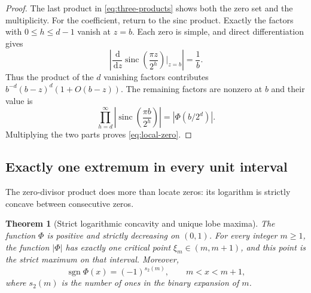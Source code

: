 \documentclass[11pt,oneside]{article}
\numberwithin{equation}{section}
\newtheorem{theorem}{Theorem}[section]
\theoremstyle{definition}
\theoremstyle{remark}
\newcommand{\dd}{\,\mathrm d}
\newcommand{\abs}[1]{\left|#1\right|}
\newcommand{\sinc}{\operatorname{sinc}}
\newcommand{\PhiUp}{\Phi}
\newcommand{\digitsum}{s_2}
\begin{document}
\begin{proof}
The last product in \eqref{eq:three-products} shows both the zero set and the multiplicity.
For the coefficient, return to the sinc product.  Exactly the factors with
\(0\le h\le d-1\) vanish at \(z=b\).  Each zero is simple, and direct differentiation gives
\[
 \left|\frac{\dd}{\dd z}\sinc\!\left(\frac{\pi z}{2^h}\right)\bigg|_{z=b}\right|
 =\frac1b.
\]
Thus the product of the \(d\) vanishing factors contributes
\(b^{-d}(b-z)^d(1+O(b-z))\).  The remaining factors are nonzero at \(b\) and their value is
\[
 \prod_{h=d}^{\infty}\left|\sinc\!\left(\frac{\pi b}{2^h}\right)\right|
 =\abs{\PhiUp(b/2^d)}.
\]
Multiplying the two parts proves \eqref{eq:local-zero}.
\end{proof}

\subsection{Exactly one extremum in every unit interval}

The zero-divisor product does more than locate zeros: its logarithm is strictly concave
between consecutive zeros.

\begin{theorem}[Strict logarithmic concavity and unique lobe maxima]
\label{thm:unique-lobe}
The function \(\PhiUp\) is positive and strictly decreasing on \((0,1)\).  For every
integer \(m\ge1\), the function \(\abs{\PhiUp}\) has exactly one critical point
\(\xi_m\in(m,m+1)\), and this point is the strict maximum on that interval.  Moreover,
\begin{equation}
 \operatorname{sgn}\PhiUp(x)=(-1)^{\digitsum(m)},
 \qquad m<x<m+1,
 \label{eq:lobe-sign}
\end{equation}
where \(\digitsum(m)\) is the number of ones in the binary expansion of \(m\).
\end{theorem}
\end{document}
